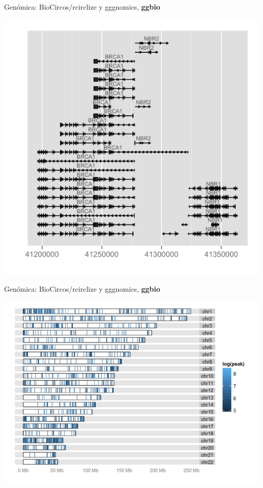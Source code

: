\documentclass[ignorenonframetext,]{beamer}
\begin{document}
\begin{frame}{Genómica: BioCircos/rcirclize y gggnomics, \textbf{ggbio}}
\protect\hypertarget{genuxf3mica-biocircosrcirclize-y-gggnomics-ggbio-1}{}

\begin{center}\includegraphics[width=0.95\linewidth]{ggnomics_1} \end{center}

\end{frame}

\begin{frame}{Genómica: BioCircos/rcirclize y gggnomics, \textbf{ggbio}}
\protect\hypertarget{genuxf3mica-biocircosrcirclize-y-gggnomics-ggbio-2}{}

\begin{center}\includegraphics[width=0.95\linewidth]{ggnomics_2} \end{center}

\end{frame}
\end{document}
